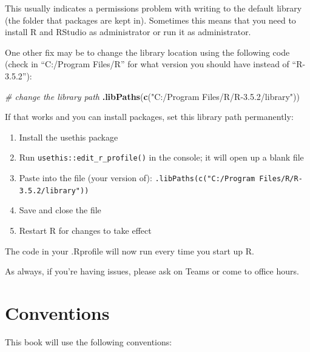 \documentclass[
  oneside]{book}
\newenvironment{Shaded}{\begin{snugshade}}{\end{snugshade}}
\newcommand{\CommentTok}[1]{\textcolor[rgb]{0.56,0.35,0.01}{\textit{#1}}}
\newcommand{\FunctionTok}[1]{\textcolor[rgb]{0.13,0.29,0.53}{\textbf{#1}}}
\newcommand{\NormalTok}[1]{#1}
\newcommand{\StringTok}[1]{\textcolor[rgb]{0.31,0.60,0.02}{#1}}
\providecommand{\tightlist}{%
  \setlength{\itemsep}{0pt}\setlength{\parskip}{0pt}}
\begin{document}
This usually indicates a permissions problem with writing to the default library (the folder that packages are kept in). Sometimes this means that you need to install R and RStudio as administrator or run it as administrator.

One other fix may be to change the library location using the following code (check in ``C:/Program Files/R'' for what version you should have instead of ``R-3.5.2''):

\begin{Shaded}
\begin{Highlighting}[]
\CommentTok{\# change the library path}
\FunctionTok{.libPaths}\NormalTok{(}\FunctionTok{c}\NormalTok{(}\StringTok{"C:/Program Files/R/R{-}3.5.2/library"}\NormalTok{))}
\end{Highlighting}
\end{Shaded}

If that works and you can install packages, set this library path permanently:

\begin{enumerate}
\def\labelenumi{\arabic{enumi}.}
\tightlist
\item
  Install the usethis package
\item
  Run \texttt{usethis::edit\_r\_profile()} in the console; it will open up a blank file
\item
  Paste into the file (your version of): \texttt{.libPaths(c("C:/Program\ Files/R/R-3.5.2/library"))}
\item
  Save and close the file
\item
  Restart R for changes to take effect
\end{enumerate}

The code in your .Rprofile will now run every time you start up R.

As always, if you're having issues, please ask on Teams or come to office hours.

\hypertarget{conventions}{%
\chapter{Conventions}\label{conventions}}

This book will use the following conventions:
\end{document}
